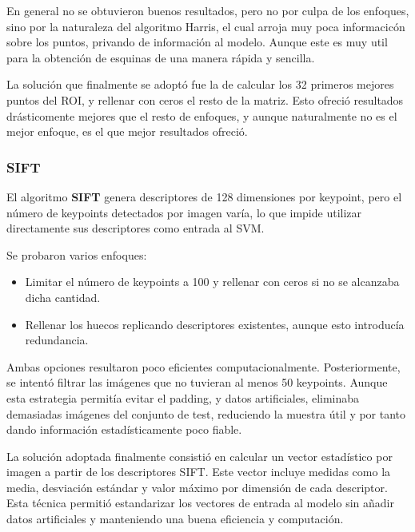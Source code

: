\documentclass[a4paper]{article}
\begin{document}
En general no se obtuvieron buenos resultados, pero no por culpa de los enfoques, sino por la naturaleza del algoritmo Harris, el cual arroja muy poca informacicón sobre los puntos, privando de información al modelo. Aunque este es muy util para la obtención de esquinas de una manera rápida y sencilla.
\par\vspace{0.5cm}
La solución que finalmente se adoptó fue la de calcular los 32 primeros mejores puntos del ROI, y rellenar con ceros el resto de la matriz. Esto ofreció resultados drásticomente mejores que el resto de enfoques, y aunque naturalmente no es el mejor enfoque, es el que mejor resultados ofreció.
\subsubsection*{SIFT}

El algoritmo \textbf{SIFT} genera descriptores de 128 dimensiones por keypoint, pero el número de keypoints detectados por imagen varía, lo que impide utilizar directamente sus descriptores como entrada al SVM.
\par\vspace{0.5cm}

Se probaron varios enfoques:
\par\vspace{0.5cm}

\begin{itemize}
    \item Limitar el número de keypoints a 100 y rellenar con ceros si no se alcanzaba dicha cantidad.
    \item Rellenar los huecos replicando descriptores existentes, aunque esto introducía redundancia.
\end{itemize}

Ambas opciones resultaron poco eficientes computacionalmente. Posteriormente, se intentó filtrar las imágenes que no tuvieran al menos 50 keypoints. Aunque esta estrategia permitía evitar el padding, y datos artificiales, eliminaba demasiadas imágenes del conjunto de test, reduciendo la muestra útil y por tanto dando información estadísticamente poco fiable.
\par\vspace{0.5cm}

La solución adoptada finalmente consistió en calcular un vector estadístico por imagen a partir de los descriptores SIFT. Este vector incluye medidas como la media, desviación estándar y valor máximo por dimensión de cada descriptor. Esta técnica permitió estandarizar los vectores de entrada al modelo sin añadir datos artificiales y manteniendo una buena eficiencia y computación.
\end{document}
